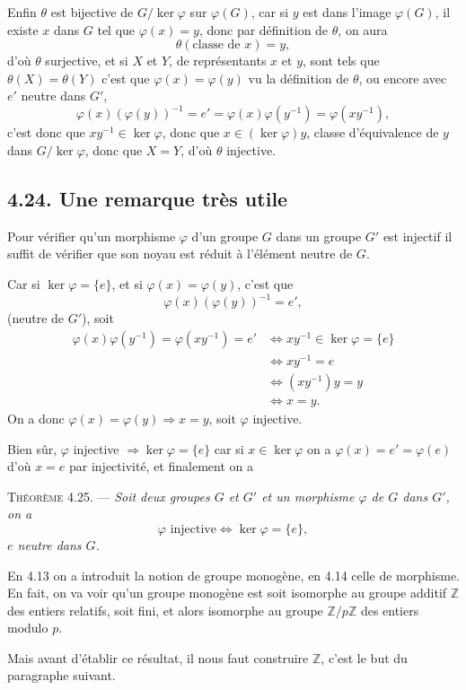 Enfin $\theta$ est bijective de $G/\ker\varphi$ sur $\varphi(G)$, car si $y$ est dans l'image $\varphi(G)$, il existe $x$ dans $G$ tel que $\varphi(x)=y$, donc par définition de $\theta$, on aura
\[
\theta(\text{classe de }x)=y,
\]
d'où $\theta$ surjective, et si $X$ et $Y$, de représentants $x$ et $y$, sont tels que $\theta(X)=\theta(Y)$ c'est que $\varphi(x)=\varphi(y)$ vu la définition de $\theta$, ou encore avec $e'$ neutre dans $G'$,
\[
\varphi(x)(\varphi(y))^{-1}=e'=\varphi(x)\varphi(y^{-1})=\varphi(xy^{-1}),
\]
c'est donc que $xy^{-1}\in\ker\varphi$, donc que $x\in(\ker\varphi)y$, classe d'équivalence de $y$ dans $G/\ker\varphi$, donc que $X=Y$, d'où $\theta$ injective. \bookend

\subsection*{4.24. Une remarque très utile}
Pour vérifier qu'un morphisme $\varphi$ d'un groupe $G$ dans un groupe $G'$ est injectif il suffit de vérifier que son noyau est réduit à l'élément neutre de $G$.

Car si $\ker\varphi=\{e\}$, et si $\varphi(x)=\varphi(y)$, c'est que
\[
\varphi(x)(\varphi(y))^{-1}=e',
\]
(neutre de $G'$), soit
\begin{align*}
\varphi(x)\varphi(y^{-1})=\varphi(xy^{-1})=e'
&\Longleftrightarrow xy^{-1}\in\ker\varphi=\{e\}\\
&\Longleftrightarrow xy^{-1}=e\\
&\Longleftrightarrow(xy^{-1})y=y\\
&\Longleftrightarrow x=y.
\end{align*}
On a donc $\varphi(x)=\varphi(y)\Rightarrow x=y$, soit $\varphi$ injective.

Bien sûr, $\varphi$ injective $\Rightarrow\ker\varphi=\{e\}$ car si $x\in\ker\varphi$ on a $\varphi(x)=e'=\varphi(e)$ d'où $x=e$ par injectivité, et finalement on a

\medskip\noindent\textsc{Théorème 4.25.} --- \emph{Soit deux groupes $G$ et $G'$ et un morphisme $\varphi$ de $G$ dans $G'$, on a
\[
\varphi\text{ injective}\Longleftrightarrow\ker\varphi=\{e\},
\]
$e$ neutre dans $G$.}

En 4.13 on a introduit la notion de groupe monogène, en 4.14 celle de morphisme. En fait, on va voir qu'un groupe monogène est soit isomorphe au groupe additif $\mathbb Z$ des entiers relatifs, soit fini, et alors isomorphe au groupe $\mathbb Z/p\mathbb Z$ des entiers modulo $p$.

Mais avant d'établir ce résultat, il nous faut construire $\mathbb Z$, c'est le but du paragraphe suivant.


